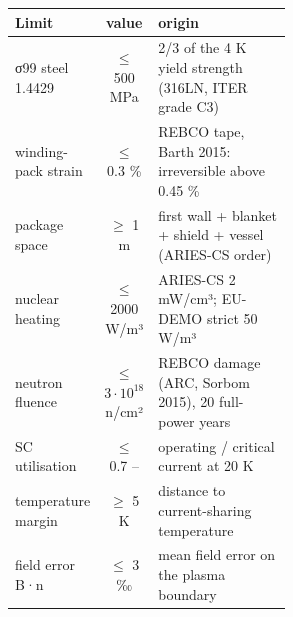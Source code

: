 \begin{tabular}{@{}lcp{0.55\linewidth}@{}}\toprule
Limit & value & origin \\\midrule
σ99 steel 1.4429 & $\le$ 500 MPa & 2/3 of the 4 K yield strength (316LN, ITER grade C3) \\
winding-pack strain & $\le$ 0.3 \% & REBCO tape, Barth 2015: irreversible above 0.45 \% \\
package space & $\ge$ 1 m & first wall + blanket + shield + vessel (ARIES-CS order) \\
nuclear heating & $\le$ 2000 W/m³ & ARIES-CS 2 mW/cm³; EU-DEMO strict 50 W/m³ \\
neutron fluence & $\le$ $3\cdot 10^{18}$ n/cm² & REBCO damage (ARC, Sorbom 2015), 20 full-power years \\
SC utilisation & $\le$ 0.7 – & operating / critical current at 20 K \\
temperature margin & $\ge$ 5 K & distance to current-sharing temperature \\
field error B·n & $\le$ 3 ‰ & mean field error on the plasma boundary \\
\bottomrule\end{tabular}
